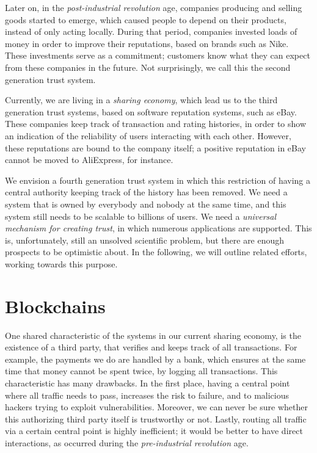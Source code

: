 Later on, in the \emph{post-industrial revolution} age, 
companies producing and selling goods started to emerge, which caused people to depend on their products, instead of only acting locally. 
During that period, companies invested loads of money in order to improve their reputations, based on brands such as Nike. 
These investments serve as a commitment; customers know what they can expect from these companies in the future. 
Not surprisingly, we call this the second generation trust system. 

Currently, we are living in a \emph{sharing economy}, which lead us to the third generation trust systems, based on software reputation systems, 
such as eBay. 
These companies keep track of transaction and rating histories, 
in order to show an indication of the reliability of users interacting with each other. 
However, these reputations are bound to the company itself; 
a positive reputation in eBay cannot be moved to AliExpress, for instance. 

We envision a fourth generation trust system in which this restriction of having a central authority keeping track of the history has been removed. 
We need a system that is owned by everybody and nobody at the same time, and this system still needs to be scalable to billions of users. 
We need a \emph{universal mechanism for creating trust}, in which numerous applications are supported. 
This is, unfortunately, still an unsolved scientific problem, 
but there are enough prospects to be optimistic about. 
In the following, we will outline related efforts, 
working towards this purpose. 


\section{Blockchains}
One shared characteristic of the systems in our current sharing economy, 
is the existence of a third party, 
that verifies and keeps track of all transactions. 
For example, the payments we do are handled by a bank, 
which ensures at the same time that money cannot be spent twice, 
by logging all transactions. 
This characteristic has many drawbacks. 
In the first place, having a central point where all traffic needs to pass, 
increases the risk to failure, and to malicious hackers trying to exploit vulnerabilities. 
Moreover, we can never be sure whether this authorizing third party itself is trustworthy or not. 
Lastly, routing all traffic via a certain central point is highly inefficient; 
it would be better to have direct interactions, 
as occurred during the \emph{pre-industrial revolution} age. 

